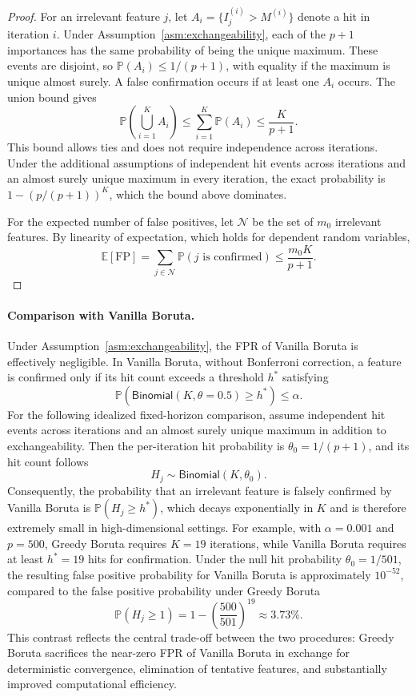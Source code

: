 \documentclass[runningheads]{llncs}
\begin{document}
\begin{proof}
For an irrelevant feature $j$, let $A_i=\{I_j^{(i)}>M^{(i)}\}$ denote a hit in iteration $i$. Under Assumption~\ref{asm:exchangeability}, each of the $p+1$ importances has the same probability of being the unique maximum. These events are disjoint, so $\mathbb{P}(A_i)\leq 1/(p+1)$, with equality if the maximum is unique almost surely. A false confirmation occurs if at least one $A_i$ occurs. The union bound gives
\[
\mathbb{P}\!\left(\bigcup_{i=1}^{K} A_i\right)
\leq \sum_{i=1}^{K}\mathbb{P}(A_i)
\leq \frac{K}{p+1}.
\]
This bound allows ties and does not require independence across iterations. Under the additional assumptions of independent hit events across iterations and an almost surely unique maximum in every iteration, the exact probability is $1-(p/(p+1))^K$, which the bound above dominates.

For the expected number of false positives, let $\mathcal{N}$ be the set of $m_0$ irrelevant features. By linearity of expectation, which holds for dependent random variables,
\[
\mathbb{E}[\mathrm{FP}] = \sum_{j\in\mathcal{N}} \mathbb{P}(j \text{ is confirmed}) \leq \frac{m_0 K}{p+1}.
\]
\end{proof}

\paragraph{Comparison with Vanilla Boruta.}
Under Assumption~\ref{asm:exchangeability}, the FPR of Vanilla Boruta is effectively negligible. In Vanilla Boruta, without Bonferroni correction, a feature is confirmed only if its hit count exceeds a threshold \(h^*\) satisfying
\[
\mathbb{P}(\mathsf{Binomial}(K,\theta=0.5) \geq h^*) \leq \alpha.
\]
For the following idealized fixed-horizon comparison, assume independent hit events across iterations and an almost surely unique maximum in addition to exchangeability. Then the per-iteration hit probability is \(\theta_0 = 1/(p+1)\), and its hit count follows
\[
H_j \sim \mathsf{Binomial}(K,\theta_0).
\]
Consequently, the probability that an irrelevant feature is falsely confirmed by Vanilla Boruta is $\mathbb{P}(H_j \geq h^*)$, which decays exponentially in \(K\) and is therefore extremely small in high-dimensional settings. For example, with \(\alpha = 0.001\) and \(p = 500\), Greedy Boruta requires \(K = 19\) iterations, while Vanilla Boruta requires at least \(h^* = 19\) hits for confirmation. Under the null hit probability \(\theta_0 = 1/501\), the resulting false positive probability for Vanilla Boruta is approximately \(10^{-52}\), compared to the false positive probability under Greedy Boruta
\[
\mathbb{P}(H_j \geq 1)
=
1 - \left(\frac{500}{501}\right)^{19}
\approx 3.73\%.
\]
This contrast reflects the central trade-off between the two procedures: Greedy Boruta sacrifices the near-zero FPR of Vanilla Boruta in exchange for deterministic convergence, elimination of tentative features, and substantially improved computational efficiency.
\end{document}

